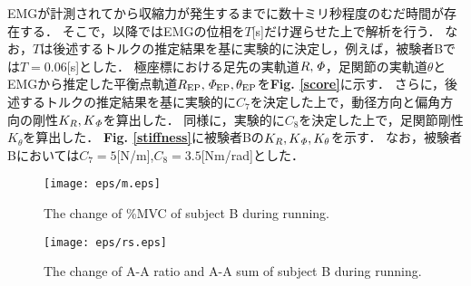 EMGが計測されてから収縮力が発生するまでに数十ミリ秒程度のむだ時間が存在する．
そこで，以降ではEMGの位相を$T$[s]だけ遅らせた上で解析を行う．
なお，$T$は後述するトルクの推定結果を基に実験的に決定し，例えば，被験者Bでは$T=0.06$[s]とした．
極座標における足先の実軌道$R,{\it \Phi}$，足関節の実軌道$\theta$とEMGから推定した平衡点軌道$R_{\rm EP},{\it \Phi}_{\rm EP},\theta_{\rm EP}$を{\bf Fig. \ref{score}}に示す．
さらに，後述するトルクの推定結果を基に実験的に$C_7$を決定した上で，動径方向と偏角方向の剛性$K_R,K_{\it \Phi}$を算出した．
同様に，実験的に$C_8$を決定した上で，足関節剛性$K_\theta$を算出した．
{\bf Fig. \ref{stiffness}}に被験者Bの$K_R,K_{\it \Phi},K_\theta$を示す．
なお，被験者Bにおいては$C_7=5$[N/m],$C_8=3.5$[Nm/rad]とした．
%
\begin{table}[!t]
 \caption{Period of running of each subject.}
 \begin{center}
 \end{center}
\end{table}
%
\begin{table}[!t]
 \caption{Ratio of stance phase of each subject in each running speed.}
 \begin{center}
 \end{center}
\end{table}
%
\begin{figure}[!t]
 \begin{center}
  \texttt{[image: eps/m.eps]}
  \caption{The change of \%MVC of subject B during running.}
  \label{m}
 \end{center}
\end{figure}
%
\begin{figure}[!t]
 \begin{center}
  \texttt{[image: eps/rs.eps]}
  \caption{The change of A-A ratio and A-A sum of subject B during running.}
  \label{rs}
 \end{center}
\end{figure}
